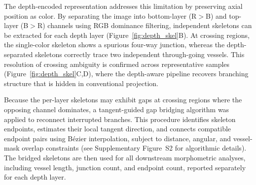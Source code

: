 The depth-encoded representation addresses this limitation by preserving axial position as color. By separating the image into bottom-layer (R$>$B) and top-layer (B$>$R) channels using RGB dominance filtering, independent skeletons can be extracted for each depth layer (Figure~\ref{fig:depth_skel}B). At crossing regions, the single-color skeleton shows a spurious four-way junction, whereas the depth-separated skeletons correctly trace two independent through-going vessels. This resolution of crossing ambiguity is confirmed across representative samples (Figure~\ref{fig:depth_skel}C,D), where the depth-aware pipeline recovers branching structure that is hidden in conventional projection.

Because the per-layer skeletons may exhibit gaps at crossing regions where the opposing channel dominates, a tangent-guided gap bridging algorithm was applied to reconnect interrupted branches. This procedure identifies skeleton endpoints, estimates their local tangent direction, and connects compatible endpoint pairs using B\'{e}zier interpolation, subject to distance, angular, and vessel-mask overlap constraints (see Supplementary Figure~S2 for algorithmic details). The bridged skeletons are then used for all downstream morphometric analyses, including vessel length, junction count, and endpoint count, reported separately for each depth layer.






